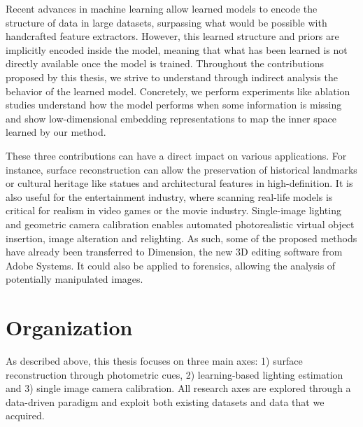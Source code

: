 Recent advances in machine learning allow learned models to encode the structure of data in large datasets, surpassing what would be possible with handcrafted feature extractors. However, this learned structure and priors are implicitly encoded inside the model, meaning that what has been learned is not directly available once the model is trained. Throughout the contributions proposed by this thesis, we strive to understand through indirect analysis the behavior of the learned model. Concretely, we perform experiments like ablation studies understand how the model performs when some information is missing and show low-dimensional embedding representations to map the inner space learned by our method. 


These three contributions can have a direct impact on various applications. For instance, surface reconstruction can allow the preservation of historical landmarks or cultural heritage like statues and architectural features in high-definition. It is also useful for the entertainment industry, where scanning real-life models is critical for realism in video games or the movie industry. Single-image lighting and geometric camera calibration enables automated photorealistic virtual object insertion, image alteration and relighting. As such, some of the proposed methods have already been transferred to Dimension, the new 3D editing software from Adobe Systems. It could also be applied to forensics, allowing the analysis of potentially manipulated images. 

\section*{Organization}

As described above, this thesis focuses on three main axes: 1) surface reconstruction through photometric cues, 2) learning-based lighting estimation and 3) single image camera calibration. All research axes are explored through a data-driven paradigm and exploit both existing datasets and data that we acquired. 

